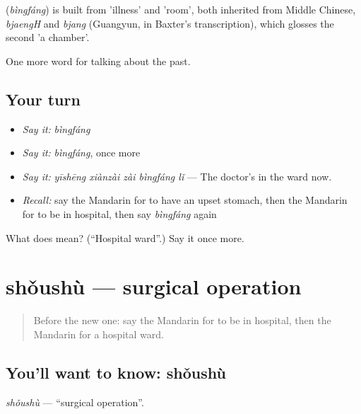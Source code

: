 \begin{cousinweb}
\textbf{} (\emph{bìngfáng}) is built from  'illness' and  'room', both inherited from Middle Chinese, \emph{bjaengH} and \emph{bjang} (Guangyun, in Baxter's transcription), which glosses the second 'a chamber'.
\end{cousinweb}

\begin{grammarlens}[title={What you've built}]
One more word for talking about the past.
\end{grammarlens}

\subsection*{Your turn}
\begin{itemize}
\raggedright
  \item \emph{Say it:} \emph{bìngfáng}
  \item \emph{Say it:} \emph{bìngfáng}, once more
  \item \emph{Say it:} \emph{yīshēng xiànzài zài bìngfáng lǐ} — The doctor's in the ward now.
  \item \emph{Recall:} say the Mandarin for to have an upset stomach, then the Mandarin for to be in hospital, then say \emph{bìngfáng} again
\end{itemize}

\begin{tcolorbox}[breakable,colback=teal!4,colframe=teal!35!black,title={Before you move on}]
What does  mean? (\textquotedblleft{}Hospital ward\textquotedblright{}.) Say it once more.
\end{tcolorbox}
\section[shǒushù]{shǒushù — surgical operation}

\label{lesson:ZH-C241-shoushu}



\begin{quote}
Before the new one: say the Mandarin for to be in hospital, then the Mandarin for a hospital ward.
\end{quote}

\subsection*{You'll want to know: shǒushù}
\emph{shǒushù} — \textquotedblleft{}surgical operation\textquotedblright{}.

